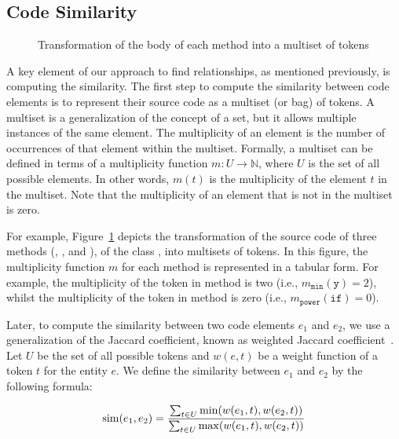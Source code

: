 

\subsection{Code Similarity}
\label{SecCodeSim}

\begin{figure}[htb]
\renewcommand{\arraystretch}{1.3}
\centering
\footnotesize

\caption{Transformation of the body of each method into a multiset of tokens}
\label{FigSourceCodeTransformation}
\end{figure}

A key element of our approach to find relationships, as mentioned previously, is computing the similarity.
The first step to compute the similarity between code elements is to represent their source code as a multiset (or bag) of tokens.
A multiset is a generalization of the concept of a set, but it allows multiple instances of the same element.
The multiplicity of an element is the number of occurrences of that element within the multiset. Formally, a multiset can be defined in terms of a multiplicity function $m: U \to \mathbb{N}$, where $U$ is the set of all possible elements. In other words, $m(t)$ is the multiplicity of the element $t$ in the multiset. Note that the multiplicity of an element that is not in the multiset is zero.

For example, Figure~\ref{FigSourceCodeTransformation} depicts the transformation of the source code of three methods (, , and ), of the class , into multisets of tokens. In this figure, the multiplicity function $m$ for each method is represented in a tabular form. For example, the multiplicity of the token  in method  is two (i.e., $m_{\mathtt{min}}(\mathtt{y}) = 2$), whilst the multiplicity of the token  in method  is zero (i.e., $m_{\mathtt{power}}(\mathtt{if}) = 0$).


Later, to compute the similarity between two code elements $e_1$ and $e_2$, we use a generalization of the Jaccard coefficient, known as weighted Jaccard coefficient~\cite{chierichetti2010finding}.
Let $U$ be the set of all possible tokens and $w(e, t)$ be a weight function of a token $t$ for the entity $e$.
We define the similarity between $e_1$ and $e_2$ by the following formula:


\begin{align}
\operatorname{sim}(e_1, e_2) = \frac{\sum_{t \in U} \min(w(e_1, t), w(e_2, t))}
                        {\sum_{t \in U} \max(w(e_1, t), w(e_2, t))}
\end{align}

